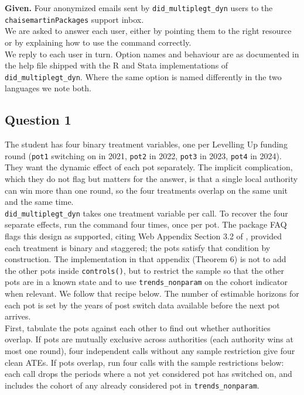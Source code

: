 

\noindent \textbf{Given.} Four anonymized emails sent by \texttt{did\_multiplegt\_dyn} users to the \texttt{chaisemartinPackages} support inbox.\\

\noindent We are asked to answer each user, either by pointing them to the right resource or by explaining how to use the command correctly.\\

\noindent We reply to each user in turn. Option names and behaviour are as documented in the help file shipped with the R and Stata implementations of \texttt{did\_multiplegt\_dyn}. Where the same option is named differently in the two languages we note both.

\subsection*{Question 1}

 The student has four binary treatment variables, one per Levelling Up funding round (\texttt{pot1} switching on in 2021, \texttt{pot2} in 2022, \texttt{pot3} in 2023, \texttt{pot4} in 2024). They want the dynamic effect of each pot separately. The implicit complication, which they do not flag but matters for the answer, is that a single local authority can win more than one round, so the four treatments overlap on the same unit and the same time.\\

 \texttt{did\_multiplegt\_dyn} takes one treatment variable per call. To recover the four separate effects, run the command four times, once per pot. The package FAQ flags this design as supported, citing Web Appendix Section 3.2 of \citet{dCDH2023}, provided each treatment is binary and staggered; the pots satisfy that condition by construction. The implementation in that appendix (Theorem 6) is not to add the other pots inside \texttt{controls()}, but to restrict the sample so that the other pots are in a known state and to use \texttt{trends\_nonparam} on the cohort indicator when relevant. We follow that recipe below. The number of estimable horizons for each pot is set by the years of post switch data available before the next pot arrives.\\

 First, tabulate the pots against each other to find out whether authorities overlap. If pots are mutually exclusive across authorities (each authority wins at most one round), four independent calls without any sample restriction give four clean ATEs. If pots overlap, run four calls with the sample restrictions below: each call drops the periods where a not yet considered pot has switched on, and includes the cohort of any already considered pot in \texttt{trends\_nonparam}.\\

